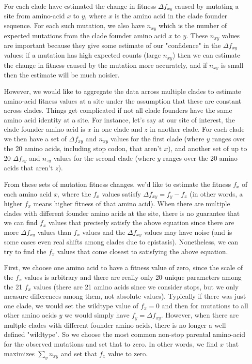 \documentclass[9pt,twocolumn,twoside]{gsajnl_modified}
\providecommand{\DIFadd}[1]{{\protect\color{blue}\uwave{#1}}} %
\providecommand{\DIFdel}[1]{{\protect\color{red}\sout{#1}}}                      %
\providecommand{\DIFaddbegin}{} %
\providecommand{\DIFaddend}{} %
\providecommand{\DIFdelbegin}{} %
\providecommand{\DIFdelend}{} %
\begin{document}
{For each clade have estimated the change in fitness $\Delta f_{xy}$ caused by mutating a site from amino-acid $x$ to $y$, where $x$ is the amino acid in the clade founder sequence.
For each such mutation, we also have $n_{xy}$ which is the number of expected mutations from the clade founder amino acid $x$ to $y$.
These $n_{xy}$ values are important because they give some estimate of our "confidence" in the $\Delta f_{xy}$ values: if a mutation has high expected counts (large $n_{xy}$) then we can estimate the change in fitness caused by the mutation more accurately, and if $n_{xy}$ is small then the estimate will be much noisier.

However, we would like to aggregate the data across multiple clades to estimate amino-acid fitness values at a site under the assumption that these are constant across clades.
Things get complicated if not all clade founders have the same amino acid identity at a site.
For instance, let's say at our site of interest, the clade founder amino acid is $x$ in one clade and $z$ in another clade.
For each clade we then have a set of $\Delta f_{xy}$ and $n_{xy}$ values for the first clade (where $y$ ranges over the 20 amino acids, including stop codon, that aren't $x$), and another set of up to 20 $\Delta f_{zy}$ and $n_{zy}$ values for the second clade (where $y$ ranges over the 20 amino acids that aren't $z$).

From these sets of mutation fitness changes, we'd like to estimate the fitness $f_x$ of each amino acid $x$, where the $f_x$ values satisfy $\Delta f_{xy} = f_y - f_x$ (in other words, a higher $f_x$ means higher fitness of that amino acid).
When there are multiple clades with different founder amino acids at the site, there is no guarantee that we can find $f_x$ values that precisely satisfy the above equation since there are more $\Delta f_{xy}$ values than $f_x$ values and the $\Delta f_{xy}$ values may have noise (and is some cases even real shifts among clades due to epistasis).
Nonetheless, we can try to find the $f_x$ values that come closest to satisfying the above equation.

First, we choose one amino acid to have a fitness value of zero, since the scale of the $f_x$ values is arbitrary and there are really only 20 unique parameters among the 21 $f_x$ values (there are 21 amino acids since we consider stops, but we only measure differences among them, not absolute values).
Typically if there was just one clade, we would set the wildtype value of $f_x = 0$ and then for mutations to all other amino acids $y$ we would simply have $f_y = \Delta f_{xy}$.
However, when there are \DIFdelbegin \DIFdel{multple }\DIFdelend \DIFaddbegin \DIFadd{multiple }\DIFaddend clades with different founder amino acids, there is no longer a well defined "wildtype".
So we choose the most common non-stop parental amino-acid for the observed mutations and set that to zero.
In other words, we find $x$ that maximizes $\sum_y n_{xy}$ and set that $f_x$ value to zero.

}
\end{document}
